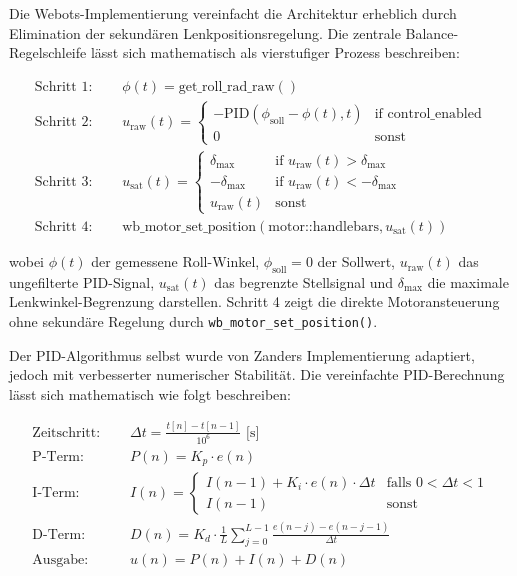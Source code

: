Die Webots-Implementierung vereinfacht die Architektur erheblich durch Elimination der sekundären Lenkpositionsregelung. 
Die zentrale Balance-Regelschleife lässt sich mathematisch als vierstufiger Prozess beschreiben:

\begin{align}
\text{Schritt 1: } \quad &\phi(t) = \text{get\_roll\_rad\_raw}() \label{eq:step1} \\
\text{Schritt 2: } \quad &u_{\text{raw}}(t) = \begin{cases}
-\text{PID}(\phi_{\text{soll}} - \phi(t), t) & \text{if control\_enabled} \\
0 & \text{sonst}
\end{cases} \label{eq:step2} \\
\text{Schritt 3: } \quad &u_{\text{sat}}(t) = \begin{cases}
\delta_{\max} & \text{if } u_{\text{raw}}(t) > \delta_{\max} \\
-\delta_{\max} & \text{if } u_{\text{raw}}(t) < -\delta_{\max} \\
u_{\text{raw}}(t) & \text{sonst}
\end{cases} \label{eq:step3} \\
\text{Schritt 4: } \quad &\text{wb\_motor\_set\_position}(\text{motor::handlebars}, u_{\text{sat}}(t)) \label{eq:step4}
\end{align}

wobei $\phi(t)$ der gemessene Roll-Winkel, $\phi_{\text{soll}} = 0$ der Sollwert, $u_{\text{raw}}(t)$ das ungefilterte PID-Signal, $u_{\text{sat}}(t)$ das begrenzte Stellsignal und $\delta_{\max}$ die maximale Lenkwinkel-Begrenzung darstellen. Schritt 4 zeigt die direkte Motoransteuerung ohne sekundäre Regelung durch \texttt{wb\_motor\_set\_position()}.

Der PID-Algorithmus selbst wurde von Zanders Implementierung adaptiert, jedoch mit verbesserter numerischer Stabilität. 
Die vereinfachte PID-Berechnung lässt sich mathematisch wie folgt beschreiben:

\begin{align}
\text{Zeitschritt: } \quad &\Delta t = \frac{t[n] - t[n-1]}{10^6} \text{ [s]} \label{eq:webots_dt} \\
\text{P-Term: } \quad &P(n) = K_p \cdot e(n) \label{eq:webots_p} \\
\text{I-Term: } \quad &I(n) = \begin{cases}
I(n-1) + K_i \cdot e(n) \cdot \Delta t & \text{falls } 0 < \Delta t < 1 \\
I(n-1) & \text{sonst}
\end{cases} \label{eq:webots_i} \\
\text{D-Term: } \quad &D(n) = K_d \cdot \frac{1}{L} \sum_{j=0}^{L-1} \frac{e(n-j) - e(n-j-1)}{\Delta t} \label{eq:webots_d} \\
\text{Ausgabe: } \quad &u(n) = P(n) + I(n) + D(n) \label{eq:webots_output}
\end{align}

